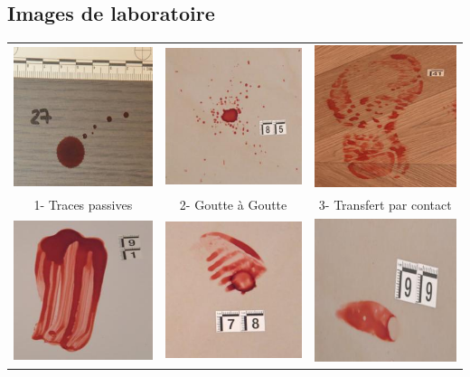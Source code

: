 \documentclass[a4paper]{article}
\begin{document}
\printbibliography

\begin{appendices}

\section{Images de laboratoire}
\label{sec: annexe}

\begin{table}[H]
    \centering
    \begin{tabular}{ccc}
        \includegraphics[width=0.20\linewidth]{../asset/data_labo/1_bois_350.jpg} & \includegraphics[width=0.20\linewidth]{../asset/data_labo/2_carrelage_523.jpg}& \includegraphics[width=0.20\linewidth]{../asset/data_labo/3_lino_888.jpg} \\
        1- Traces passives & 2- Goutte à Goutte & 3- Transfert par contact \\
        \includegraphics[width=0.20\linewidth]{../asset/data_labo/4_papier_1586.jpg} & \includegraphics[width=0.20\linewidth]{../asset/data_labo/5_carrelage_5605.jpg} & \includegraphics[width=0.20\linewidth]{../asset/data_labo/6_bois_604.jpg} \\

\end{tabular}
\end{table}
\end{appendices}
\end{document}
